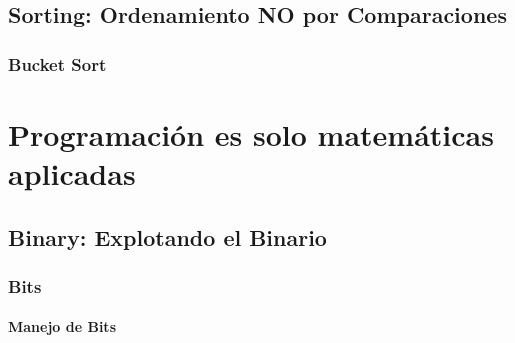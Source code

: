 \documentclass[12pt, fleqn]{report}                             %
\theoremstyle{break}                                            %
\begin{document}
    \chapter{Sorting: Ordenamiento NO por Comparaciones}
        
        \section{Bucket Sort}



\part{Programación es solo matemáticas aplicadas}

    \clearpage
    \chapter{Binary: Explotando el Binario}

        \section{Bits}

            \subsection{Manejo de Bits}
\end{document}
